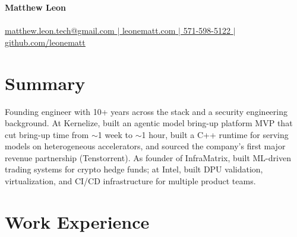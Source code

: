 \documentclass[letterpaper,10pt]{article}
\begin{document}
\begin{center}
{\Huge\bfseries Matthew Leon}\\[2pt]
{\large \headline}\\[3pt]
\underline{\href{mailto:matthew.leon.tech@gmail.com}{matthew.leon.tech@gmail.com} $|$ \href{https://leonematt.com}{leonematt.com} $|$ 571-598-5122 $|$ \href{https://github.com/leonematt}{github.com/leonematt}}
\end{center}
\vspace{-6pt}

\section{Summary}
Founding engineer with 10+ years across the stack and a security engineering background. At Kernelize, built an agentic model bring-up platform MVP that cut bring-up time from $\sim$1 week to $\sim$1 hour, built a C++ runtime for serving models on heterogeneous accelerators, and sourced the company's first major revenue partnership (Tenstorrent). As founder of InfraMatrix, built ML-driven trading systems for crypto hedge funds; at Intel, built DPU validation, virtualization, and CI/CD infrastructure for multiple product teams.

\section{Work Experience}
\end{document}
